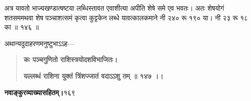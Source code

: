 \documentclass[11pt, openany]{book}
\begin{document}
\begin{sloppypar}
\hangindent=0.2in अत्र यावतो भाज्यखण्डात्षष्टया लब्धिस्तावत एवाशीत्या अपीति शेषे समे एव भवतः। अतः शेषयोगं शतसममथवा शेष पञ्चाशत्समं कृत्वा कुट्टकेन लब्धे यावत्कालकमाने नी २४० रू १९० या। नी २३ रू १८ का ॥ १४६ ॥

\hangindent=0.2in \hspace{0.2in}अथान्यदुदाहरणमनुष्टुभाऽऽह---

\begin{quote}
\hspace{1in}\textbf{कः पञ्चगुणितो राशिस्त्रयोदशविभाजितः।}

\hspace{1in}\textbf{यल्लब्धं राशिना युक्तं त्रिंशज्जातं वदाऽऽशु तम् ॥ १४७ ।।}
\end{quote}
\end{sloppypar}
\thispagestyle{empty}
\newpage

\onehalfspacing
\hspace{2in}\textbf{नवाङ्कुरव्याख्यासहितम्।}\hspace{2in}१६९

\vspace{5mm}
\end{document}
